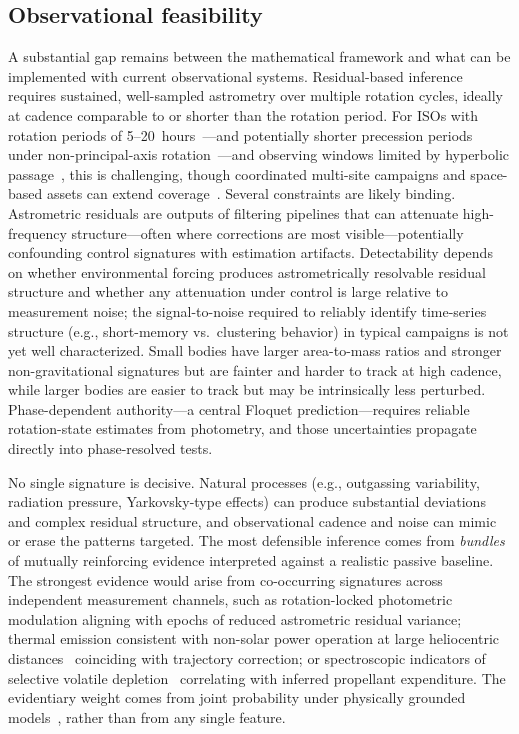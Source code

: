 \documentclass{article}
\begin{document}
\subsection{Observational feasibility}

A substantial gap remains between the mathematical framework and what can be implemented with current observational systems. Residual-based inference requires sustained, well-sampled astrometry over multiple rotation cycles, ideally at cadence comparable to or shorter than the rotation period. For ISOs with rotation periods of 5--20~hours~\cite{Kokotanekova2017Rotation}---and potentially shorter precession periods under non-principal-axis rotation~\cite{scarmato2026wobble}---and observing windows limited by hyperbolic passage~\cite{jewitt2022interstellar}, this is challenging, though coordinated multi-site campaigns and space-based assets can extend coverage~\cite{engelhardt2017population,eldadi2025}. Several constraints are likely binding. Astrometric residuals are outputs of filtering pipelines that can attenuate high-frequency structure---often where corrections are most visible---potentially confounding control signatures with estimation artifacts. Detectability depends on whether environmental forcing produces astrometrically resolvable residual structure and whether any attenuation under control is large relative to measurement noise; the signal-to-noise required to reliably identify time-series structure (e.g., short-memory vs.\ clustering behavior) in typical campaigns is not yet well characterized. Small bodies have larger area-to-mass ratios and stronger non-gravitational signatures but are fainter and harder to track at high cadence, while larger bodies are easier to track but may be intrinsically less perturbed. Phase-dependent authority---a central Floquet prediction---requires reliable rotation-state estimates from photometry, and those uncertainties propagate directly into phase-resolved tests.

No single signature is decisive. Natural processes (e.g., outgassing variability, radiation pressure, Yarkovsky-type effects) can produce substantial deviations and complex residual structure, and observational cadence and noise can mimic or erase the patterns targeted. The most defensible inference comes from \emph{bundles} of mutually reinforcing evidence interpreted against a realistic passive baseline. The strongest evidence would arise from co-occurring signatures across independent measurement channels, such as rotation-locked photometric modulation aligning with epochs of reduced astrometric residual variance; thermal emission consistent with non-solar power operation at large heliocentric distances~\cite{gibson2018krusty} coinciding with trajectory correction; or spectroscopic indicators of selective volatile depletion~\cite{mumma2011composition,altwegg2019rosina} correlating with inferred propellant expenditure. The evidentiary weight comes from joint probability under physically grounded models~\cite{eldadi2025,wright2018technosignatures}, rather than from any single feature.
\end{document}
